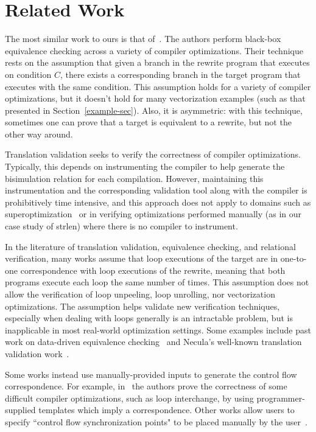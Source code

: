 \section{Related Work}

The most similar work to ours is that of~\cite{Dahiya17ASPLAS}. The
authors perform black-box equivalence checking across a variety of
compiler optimizations. Their technique rests on the assumption that
given a branch in the rewrite program that executes on condition $C$,
there exists a corresponding branch in the target program that executes
with the same condition. This assumption holds for a variety of
compiler optimizations, but it doesn't hold for many vectorization
examples (such as that presented in Section~\ref{example-sec}). Also,
it is asymmetric: with this technique, sometimes one can prove that a
target is equivalent to a rewrite, but not the other way around.

Translation validation seeks to verify
the correctness of compiler optimizations. Typically, this
depends on instrumenting the compiler to help generate
the bisimulation relation for each compilation. However,
maintaining this instrumentation and the corresponding
validation tool along with the compiler is prohibitively time
intensive, and this approach does not apply to domains such as
superoptimization~\cite{Massalin1987,Schkufza2013,Churchill2017} or in
verifying optimizations performed manually (as in our case study of
\libc{} strlen) where there is no compiler to instrument.

In the literature of translation validation, equivalence checking,
and relational verification, many works assume
that loop executions of the target are in one-to-one correspondence
with loop executions of the rewrite, meaning that both programs
execute each loop the same number of times. This assumption does
not allow the verification of loop unpeeling, loop unrolling, nor
vectorization optimizations. The assumption helps validate new
verification techniques, especially when dealing with loops generally
is an intractable problem, but is inapplicable in most real-world
optimization settings. Some examples include past work on data-driven
equivalence checking~\cite{Sharma2013} and Necula's well-known
translation validation work~\cite{Necula2000}.

Some works instead use manually-provided inputs to generate the
control flow correspondence. For example, in~\cite{Kundu2009}
the authors prove the correctness of some difficult compiler
optimizations, such as loop interchange, by using programmer-supplied
templates which imply a correspondence. Other works allow users to
specify ``control flow synchronization points" to be placed manually
by the user~\cite{Kiefer2016}.

